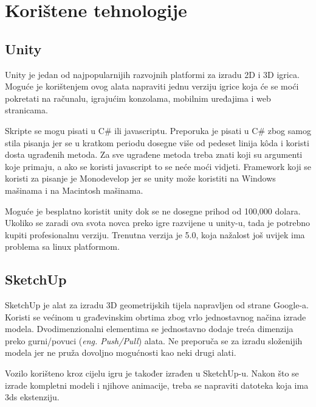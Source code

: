 \section{Korištene tehnologije}
\subsection{Unity}
Unity je jedan od najpopularnijih razvojnih platformi za izradu 2D i 3D igrica. Moguće je korištenjem ovog alata napraviti jednu verziju igrice koja će se moći pokretati na računalu, igrajućim konzolama, mobilnim uređajima i web stranicama. \par
Skripte se mogu pisati u C\# ili javascriptu. Preporuka je pisati u C\# zbog samog stila pisanja jer se u kratkom periodu dosegne više od pedeset linija k\^oda i koristi dosta ugrađenih metoda. Za sve ugrađene metoda treba znati koji su argumenti koje primaju, a ako se koristi javascript to se neće moći vidjeti. Framework koji se koristi za pisanje je Monodevelop jer se unity može koristiti na Windows mašinama i na Macintosh mašinama. \par
Moguće je besplatno koristit unity dok se ne dosegne prihod od 100,000 dolara. Ukoliko se zaradi ova svota novca preko igre razvijene u unity-u, tada je potrebno kupiti profesionalnu verziju. Trenutna verzija je 5.0, koja nažalost još uvijek ima problema sa linux platformom.

\subsection{SketchUp}
SketchUp je alat za izradu 3D geometrijskih tijela napravljen od strane Google-a. Koristi se većinom u građevinskim obrtima zbog vrlo jednostavnog načina izrade modela. Dvodimenzionalni elementima se jednostavno dodaje treća dimenzija preko gurni/povuci (\emph{eng. Push/Pull}) alata. Ne preporuča se za izradu složenijih modela jer ne pruža dovoljno mogućnosti kao neki drugi alati. \par
Vozilo korišteno kroz cijelu igru je također izrađen u SketchUp-u. Nakon što se izrade kompletni modeli i njihove animacije, treba se napraviti datoteka koja ima 3ds ekstenziju.

